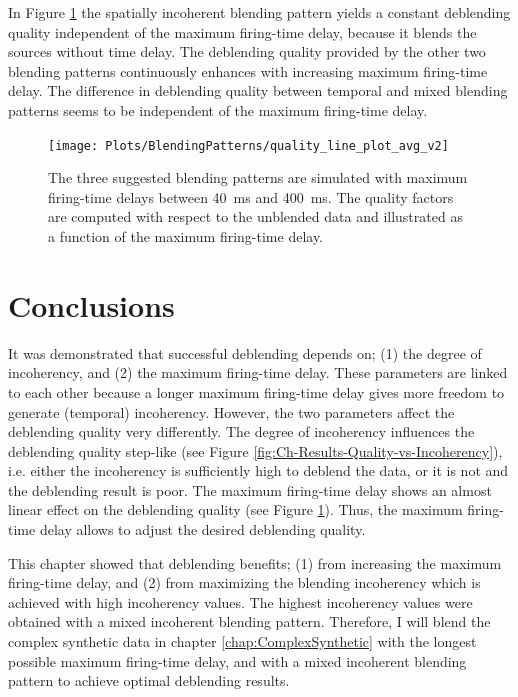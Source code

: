 In Figure \ref{fig:Ch-Results-QualityFactors} the spatially incoherent blending pattern yields a constant deblending quality independent of the maximum firing-time delay, because it blends the sources without time delay. The deblending quality provided by the other two blending patterns continuously enhances with increasing maximum firing-time delay. The difference in deblending quality between temporal and mixed blending patterns seems to be independent of the maximum firing-time delay.

\begin{figure}
	\centering
	\texttt{[image: Plots/BlendingPatterns/quality\_line\_plot\_avg\_v2]}
	\caption{The three suggested blending patterns are simulated with maximum firing-time delays between \SI{40}{\milli\second} and \SI{400}{\milli\second}. The quality factors are computed with respect to the unblended data and illustrated as a function of the maximum firing-time delay.}
	\label{fig:Ch-Results-QualityFactors}
\end{figure}
			
			

\section{Conclusions}	\label{fig:Ch-Incoherency-Conclusions}

It was demonstrated that successful deblending depends on; (1) the degree of incoherency, and (2) the maximum firing-time delay. These parameters are linked to each other because a longer maximum firing-time delay gives more freedom to generate (temporal) incoherency. However, the two parameters affect the deblending quality very differently. The degree of incoherency influences the deblending quality step-like (see Figure \ref{fig:Ch-Results-Quality-vs-Incoherency}), i.e. either the incoherency is sufficiently high to deblend the data, or it is not and the deblending result is poor. The maximum firing-time delay shows an almost linear effect on the deblending quality (see Figure \ref{fig:Ch-Results-QualityFactors}). Thus, the maximum firing-time delay allows to adjust the desired deblending quality.

This chapter showed that deblending benefits; (1) from increasing the maximum firing-time delay, and (2) from maximizing the blending incoherency which is achieved with high incoherency values. The highest incoherency values were obtained with a mixed incoherent blending pattern. Therefore, I will blend the complex synthetic data in chapter \ref{chap:ComplexSynthetic} with the longest possible maximum firing-time delay, and with a mixed incoherent blending pattern to achieve optimal deblending results.


